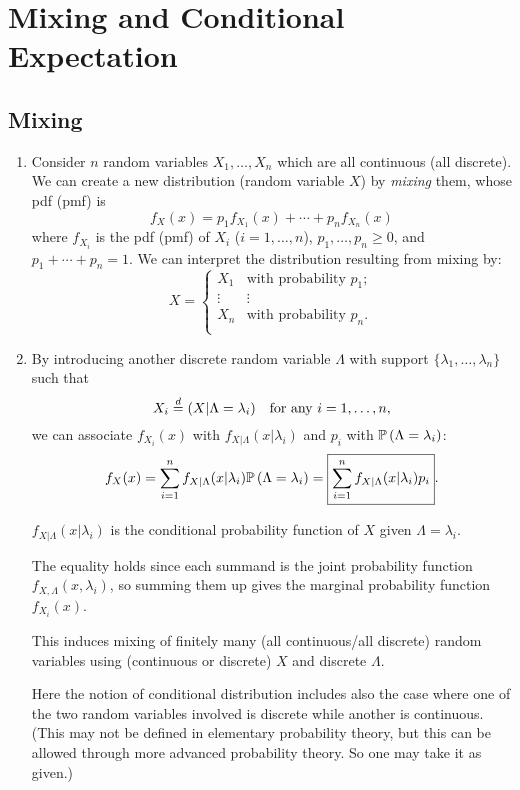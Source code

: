 \section{Mixing and Conditional Expectation}
\label{sect:mixing-and-ce}
\subsection{Mixing}
\begin{enumerate}
\item Consider \(n\) random variables \(X_1,\dotsc,X_n\) which are all continuous
(all discrete). We can create a new distribution (random variable \(X\)) by
\emph{mixing} them, whose pdf (pmf) is
\[
f_X(x)=p_1f_{X_1}(x)+\dotsb+p_nf_{X_n}(x)
\]
where \(f_{X_i}\) is the pdf (pmf) of \(X_i\) (\(i=1,\dotsc,n\)),
\(p_1,\dotsc,p_n\ge 0\), and \(p_1+\dotsb+p_n=1\). We can interpret the
distribution resulting from mixing by:
\[
X=\begin{cases}
X_1&\text{with probability \(p_1\)};\\
\vdots&\vdots\\
X_n&\text{with probability \(p_n\)}.\\
\end{cases}
\]
\item \label{it:mixing-finite}
By introducing another discrete random variable \(\Lambda\) with support
\(\{\lambda_1,\dotsc,\lambda_n\}\) such that
\[
X_i\overset{d}= (X|\Lambda=\lambda_i)\quad\text{for any \(i=1,\dotsc,n\)},
\]
we can associate \(f_{X_i}(x)\) with \(f_{X|\Lambda}(x|\lambda_i)\) and \(p_i\)
with \(\mathbb{P}\left(\Lambda=\lambda_i\right)\):
\[
f_X(x)=\sum_{i=1}^{n}f_{X|\Lambda}(x|\lambda_i)\mathbb{P}\left(\Lambda=\lambda_i\right)
=\boxed{\sum_{i=1}^{n}f_{X|\Lambda}(x|\lambda_i)p_i}.
\]
\begin{note}
\(f_{X|\Lambda}(x|\lambda_i)\) is the conditional probability function of \(X\)
given \(\Lambda=\lambda_i\).
\end{note}

The equality holds since each summand is the joint probability function
\(f_{X,\Lambda}(x,\lambda_i)\), so summing them up gives the marginal
probability function \(f_{X_i}(x)\).

This induces mixing of finitely many (all continuous/all discrete) random
variables using (continuous or discrete) \(X\) and discrete \(\Lambda\).

\begin{note}
Here the notion of conditional distribution includes also the case
where one of the two random variables involved is discrete while another is
continuous. (This may not be defined in elementary probability theory, but this
can be allowed through more advanced probability theory. So one may take it as
given.)
\end{note}


\end{enumerate}
